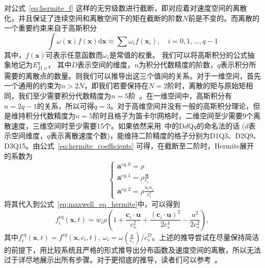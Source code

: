 对公式~\ref{eq:hermite_f} 这样的无穷级数进行截断，即对应着对速度空间的离散化，并且保证了连续空间和离散空间下的矩在截断的阶数$N$前是不变的。而离散的一个重要约束来自于高斯积分
\begin{equation}
    \int \omega(\boldsymbol{x}) f(\boldsymbol{x}) \mathrm{d} \boldsymbol{x} \approx \sum \omega_i f(\boldsymbol{x}_i), \quad i=0,1, \ldots, q-1
\end{equation}
其中，$f(\boldsymbol{x})$可表示任意函数而$\omega_i$是常值的权重。
我们可以将高斯积分的公式抽象地记为$E^q_{D,n}$，
其中$D$表示空间的维度，$n$为积分代数精度的阶数，$q$表示积分所需要的离散点的数量。则我们可以推导出这三个值间的关系。对于一维空间，首先一个通用的约束为$n>2N$，即我们若要保持在$N=2$阶时，离散的矩与原始矩相同，我们至少需要积分代数精度为$n=5$阶~\citep{shan2006kinetic}。在一维空间中，高斯积分有$n=2q-1$的关系，所以可得$q=3$。对于高维空间并没有一般的高斯积分理论，但是维持积分代数精度为$n=5$阶时且格子为笛卡尔网格时，二维空间至少需要9个离散速度，三维空间时至少需要15个。如果依然采用~\citep{qian1992lattice}中的D$d$Q$q$的命名法的话 ($d$表示空间维度，$q$表示离散速度个数)，能维持二阶精度的格子分别为D1Q3、D2Q9、D3Q15。由公式~\ref{eq:hermite_coefficients} 可得，在截断至二阶时，Hermite展开的系数为
\begin{equation}
    \left\{\begin{array}{l}\boldsymbol{a}^{eq, 0}=\rho \\ \boldsymbol{a}^{eq, 1}=\rho \frac{\boldsymbol{u}}{c_s} \\ \boldsymbol{a}^{eq, 2}=\rho \frac{u_i u_j}{c_s^2}\end{array}\right.
\end{equation}
将其代入到公式~\ref{eq:maxwell_eq_hermite}中，可以得到
\begin{equation}
    f_i^{eq}(\boldsymbol{x}, t)=w_i \rho\left(1+\frac{\mathbf{c}_i \cdot \boldsymbol{u}}{c_s^2}+\frac{\left(\mathbf{c}_i \cdot \boldsymbol{u}\right)^2}{2 c_s^4}-\frac{u^2}{2 c_s^2}\right),
    \label{eq:f_eq_o2}
\end{equation}
其中$f_i^{eq}(\boldsymbol{x}, t)=f^{eq}(\boldsymbol{x}, {c}_i, t)$, $\omega_i=\omega(\frac{\mathbf{c}}{c_s})/c_s^D$。上述的推导尝试在尽量保持简洁的前提下，用比较系统且严格的形式推导出分布函数及速度空间的离散，所以无法过于详尽地展示出所有步骤。对于更彻底的推导，读者们可以参考~\citep{shan2006kinetic, malaspinas2010lattice}。


